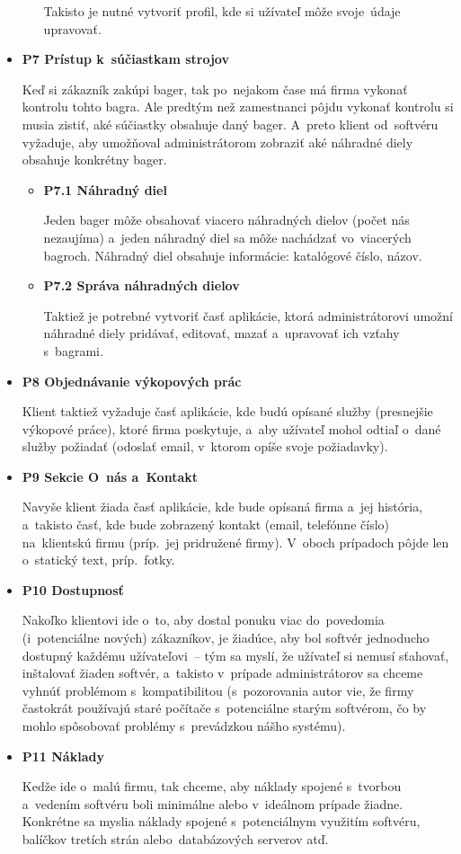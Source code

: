 \begin{itemize}
\begin{itemize}
Takisto je nutné vytvoriť profil, kde si užívateľ môže svoje~údaje upravovať.
\end{itemize}

\item \textbf{P7 Prístup k~súčiastkam strojov}

Keď si zákazník zakúpi bager, tak po~nejakom čase má firma vykonať kontrolu tohto bagra. Ale predtým než zamestnanci pôjdu vykonať kontrolu si musia zistiť, aké súčiastky obsahuje daný bager. A~preto klient od~softvéru vyžaduje, aby umožňoval administrátorom zobraziť aké náhradné diely obsahuje konkrétny bager.

\begin{itemize}
\item \textbf{P7.1 Náhradný diel}

Jeden bager môže obsahovať viacero náhradných dielov (počet nás nezaujíma) a~jeden náhradný diel sa môže nachádzať vo~viacerých bagroch. Náhradný diel obsahuje informácie: katalógové číslo, názov.

\item \textbf{P7.2 Správa náhradných dielov}

Taktiež je potrebné vytvoriť časť aplikácie, ktorá administrátorovi umožní náhradné diely pridávať, editovať, mazať a~upravovať ich vzťa\-hy s~bagrami.
\end{itemize}

\item \textbf{P8 Objednávanie výkopových prác}

Klient taktiež vyžaduje časť aplikácie, kde budú opísané služby (presnejšie výkopové práce), ktoré firma poskytuje, a~aby užívateľ mohol odtiaľ o~dané služby požiadať (odoslať email, v~ktorom opíše svoje požiadavky).

\item \textbf{P9 Sekcie O~nás a~Kontakt}

Navyše klient žiada časť aplikácie, kde bude opísaná firma a~jej história, a~takisto časť, kde bude zobrazený kontakt (email, telefónne číslo) na~klientskú firmu (príp.~jej pridružené firmy). V~oboch prípadoch pôjde len o~statický text, príp.~fotky.

\item \textbf{P10 Dostupnosť}
\label{dostupnost}

Nakoľko klientovi ide o~to, aby dostal ponuku viac do~povedomia (i~potenciálne nových) zákazníkov, je žiadúce, aby bol softvér jednoducho dostupný každému užívateľovi~-- tým sa myslí, že užívateľ si nemusí sťahovať, inštalovať žiaden softvér, a~takisto v~prípade administrátorov sa chceme vyhnúť problémom s~kompatibilitou (s~pozorovania autor vie, že firmy častokrát používajú staré počítače s~potenciálne starým softvérom, čo by mohlo spôsobovať problémy s~prevádzkou nášho systému).

\item \textbf{P11 Náklady}

Kedže ide o~malú firmu, tak chceme, aby náklady spojené s~tvorbou a~vedením softvéru boli minimálne alebo v~ideálnom prípade žiadne. Konkrétne sa myslia náklady spojené s~potenciálnym využitím softvéru, balíčkov tretích strán alebo~databázových serverov atď.
\end{itemize}

